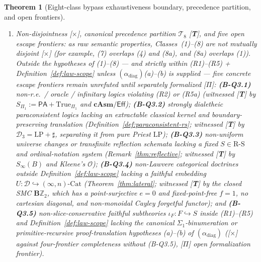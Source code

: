 \documentclass[11pt]{article}
\theoremstyle{plain}
\newtheorem{theorem}{Theorem}[section]
\theoremstyle{definition}
\newcommand{\RS}{\mathrm{R\text{-}S}}
\newcommand{\Cat}{\mathrm{Cat}}
\newcommand{\PA}{\mathsf{PA}}
\newcommand{\Eff}{\ensuremath{\mathsf{Eff}}}
\begin{document}
\begin{theorem}[Eight-class bypass exhaustiveness boundary, precedence partition, and open frontiers]
\begin{enumerate}[nosep,label=(\roman*)]
\begin{enumerate}[nosep,label=(\arabic*)]
  \item \emph{Non-classical / paraconsistent / enactment boundary}: intuitionistic, linear-with-\texttt{!}, and realizability r.e.\ systems in $\RS$ admitting negative translation are blocked by Theorems~\ref{thm:afnt-alpha}~(ii) and~\ref{thm:dual-afnt}~(ii) \textup{[\textbf{C}]} (on $(\alpha_{\mathrm{diag}})$(a)--(b)), while paraconsistent systems with an extractable classical kernel $S^* \in \RS$ and boundary-preserving translation are blocked by Theorem~\ref{thm:paraconsistent-afnt} \textup{[\textbf{C}]}.
  \end{enumerate}
\item \emph{Non-disjointness \textup{[\textbf{$\times$}]}, canonical precedence partition $\mathcal{T}_8$ \textup{[\textbf{T}]}, and five open escape frontiers}: as raw semantic properties, Classes~(1)--(8) are \emph{not} mutually disjoint \textup{[\textbf{$\times$}]} (for example, (7) overlaps (4) and (8a), and (8a) overlaps (1)). Outside the hypotheses of (1)--(8) --- and strictly within (R1)--(R5) + Definition~\ref{def:law-scope} unless $(\alpha_{\mathrm{diag}})$(a)--(b) is supplied --- \emph{five} concrete escape frontiers remain unrefuted until separately formalized \textup{[\textbf{$\Pi$}]}:
  \textbf{(B-Q3.1)} non-r.e.\ / oracle / infinitary logics violating (R2) or (R5a) (witnessed \textup{[\textbf{T}]} by $S_{\Pi_1} := \PA + \mathrm{True}_{\Pi_1}$ and $\mathbf{cAsm}/\Eff$);
  \textbf{(B-Q3.2)} strongly dialetheic paraconsistent logics lacking an extractable classical kernel and boundary-preserving translation (Definition~\ref{def:paraconsistent-rs}; witnessed \textup{[\textbf{T}]} by $\mathcal{D}_3 = \mathrm{LP} + \sharp$, separating it from pure Priest $\mathrm{LP}$);
  \textbf{(B-Q3.3)} non-uniform universe changes or transfinite reflection schemata lacking a fixed $S \in \RS$ and ordinal-notation system (Remark~\ref{thm:reflective}; witnessed \textup{[\textbf{T}]} by $S_\infty(B)$ and Kleene's $\mathcal{O}$);
  \textbf{(B-Q3.4)} non-Lawvere categorical doctrines outside Definition~\ref{def:law-scope} lacking a faithful embedding $U : \mathcal{D} \hookrightarrow (\infty, n)\text{-}\Cat$ (Theorem~\ref{thm:lateral}; witnessed \textup{[\textbf{T}]} by the closed SMC $\mathbf{B}\mathbb{Z}_2$, which has a point-surjective $e = 0$ and fixed-point-free $f = 1$, no cartesian diagonal, and non-monoidal Cayley forgetful functor); and
  \textbf{(B-Q3.5)} non-slice-conservative faithful subtheories $\iota_F : F \hookrightarrow S$ inside (R1)--(R5) and Definition~\ref{def:law-scope} lacking the canonical $\Sigma_1$-binumeration or primitive-recursive proof-translation hypotheses (a)--(b) of $(\alpha_{\mathrm{diag}})$ (\textup{[\textbf{$\times$}]} against four-frontier completeness without (B-Q3.5), \textup{[\textbf{$\Pi$}]} open formalization frontier).

\end{enumerate}
\end{theorem}
\end{document}
